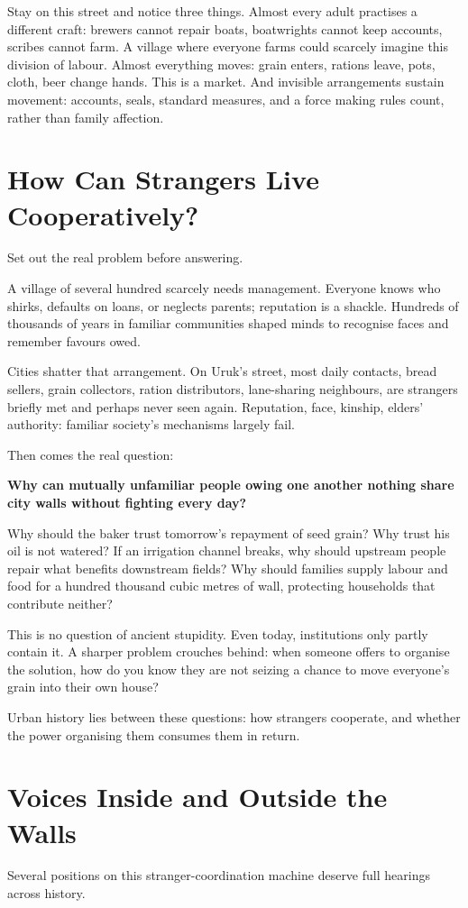 Stay on this street and notice three things. Almost every adult practises a different craft: brewers cannot repair boats, boatwrights cannot keep accounts, scribes cannot farm. A village where everyone farms could scarcely imagine this division of labour. Almost everything moves: grain enters, rations leave, pots, cloth, beer change hands. This is a market. And invisible arrangements sustain movement: accounts, seals, standard measures, and a force making rules count, rather than family affection.

\section{How Can Strangers Live Cooperatively?}
Set out the real problem before answering.

A village of several hundred scarcely needs management. Everyone knows who shirks, defaults on loans, or neglects parents; reputation is a shackle. Hundreds of thousands of years in familiar communities shaped minds to recognise faces and remember favours owed.

Cities shatter that arrangement. On Uruk's street, most daily contacts, bread sellers, grain collectors, ration distributors, lane-sharing neighbours, are strangers briefly met and perhaps never seen again. Reputation, face, kinship, elders' authority: familiar society's mechanisms largely fail.

Then comes the real question:

\textbf{Why can mutually unfamiliar people owing one another nothing share city walls without fighting every day?}

Why should the baker trust tomorrow's repayment of seed grain? Why trust his oil is not watered? If an irrigation channel breaks, why should upstream people repair what benefits downstream fields? Why should families supply labour and food for a hundred thousand cubic metres of wall, protecting households that contribute neither?

This is no question of ancient stupidity. Even today, institutions only partly contain it. A sharper problem crouches behind: when someone offers to organise the solution, how do you know they are not seizing a chance to move everyone's grain into their own house?

Urban history lies between these questions: how strangers cooperate, and whether the power organising them consumes them in return.

\section{Voices Inside and Outside the Walls}
Several positions on this stranger-coordination machine deserve full hearings across history.

